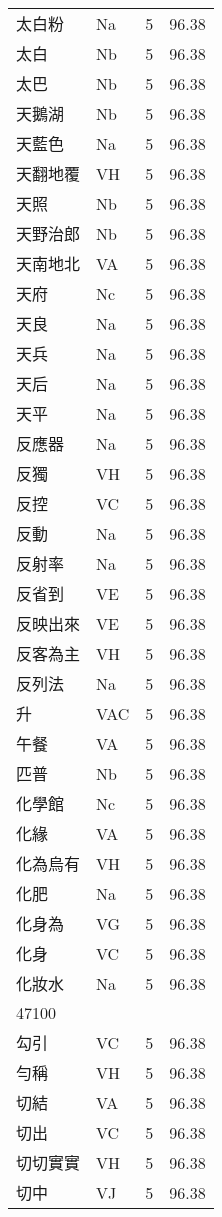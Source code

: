 \documentclass[twocolumn]{book}
\begin{document}
\begin{supertabular}{llrr}
太白粉 & Na & 5 &  96.38\\
太白 & Nb & 5 &  96.38\\
太巴 & Nb & 5 &  96.38\\
天鵝湖 & Nb & 5 &  96.38\\
天藍色 & Na & 5 &  96.38\\
天翻地覆 & VH & 5 &  96.38\\
天照 & Nb & 5 &  96.38\\
天野治郎 & Nb & 5 &  96.38\\
天南地北 & VA & 5 &  96.38\\
天府 & Nc & 5 &  96.38\\
天良 & Na & 5 &  96.38\\
天兵 & Na & 5 &  96.38\\
天后 & Na & 5 &  96.38\\
天平 & Na & 5 &  96.38\\
反應器 & Na & 5 &  96.38\\
反獨 & VH & 5 &  96.38\\
反控 & VC & 5 &  96.38\\
反動 & Na & 5 &  96.38\\
反射率 & Na & 5 &  96.38\\
反省到 & VE & 5 &  96.38\\
反映出來 & VE & 5 &  96.38\\
反客為主 & VH & 5 &  96.38\\
反列法 & Na & 5 &  96.38\\
升 & VAC & 5 &  96.38\\
午餐 & VA & 5 &  96.38\\
匹普 & Nb & 5 &  96.38\\
化學館 & Nc & 5 &  96.38\\
化緣 & VA & 5 &  96.38\\
化為烏有 & VH & 5 &  96.38\\
化肥 & Na & 5 &  96.38\\
化身為 & VG & 5 &  96.38\\
化身 & VC & 5 &  96.38\\
化妝水 & Na & 5 &  96.38\\
47100\\
勾引 & VC & 5 &  96.38\\
勻稱 & VH & 5 &  96.38\\
切結 & VA & 5 &  96.38\\
切出 & VC & 5 &  96.38\\
切切實實 & VH & 5 &  96.38\\
切中 & VJ & 5 &  96.38\\

\end{supertabular}
\end{document}
